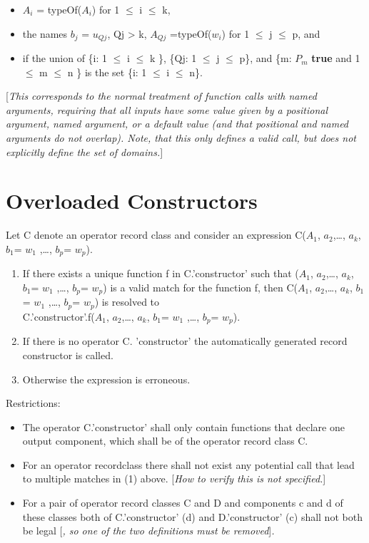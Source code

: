 \documentclass[10pt,a4paper]{report}
\def\doublelabel#1{\label{#1}\hypertarget{#1}{}}
\renewcommand{\labelenumi}{\arabic{enumi}.}
\begin{document}
\begin{itemize}
\item
  $A_{i}$ = typeOf($A_{i}$) for 1 $\le$ i $\le$ k,
\item
  the names $b_{j}$ = $u_{Qj}$, Qj \textgreater{}
  k, $A_{Qj}$ =typeOf($w_{i}$) for 1 $\le$ j $\le$ p, and
\item
  if the union of \{i: 1 $\le$ i $\le$ k \}, \{Qj: 1 $\le$ j $\le$ p\}, and \{m:
  $P_{m}$ \textbf{true} and 1 $\le$ m $\le$ n \} is the set \{i: 1 $\le$
  i $\le$ n\}.
\end{itemize}

{[}\emph{This corresponds to the normal treatment of function calls with
named arguments, requiring that all inputs have some value given by a
positional argument, named argument, or a default value (and that
positional and named arguments do not overlap). Note, that this only
defines a valid call, but does not explicitly define the set of
domains.}{]}

\section{Overloaded Constructors}\doublelabel{overloaded-constructors}

Let C denote an operator record class and consider an expression
C($A_1$, $a_{2}$,\ldots{}, $a_{k}$,
$b_{1}$= $w_{1}$ ,\ldots{}, $b_{p}$=
$w_{p}$).

\begin{enumerate}
\def\labelenumi{\arabic{enumi}.}
\item
  If there exists a {unique} function f in C.'constructor' such that
  ($A_1$, $a_{2}$,\ldots{}, $a_{k}$,
  $b_{1}$= $w_{1}$ ,\ldots{}, $b_{p}$=
  $w_{p}$) is a valid match for the function f, then
  C($A_1$, $a_{2}$,\ldots{}, $a_{k}$,
  $b_{1}$= $w_{1}$ ,\ldots{}, $b_{p}$=
  $w_{p}$) is resolved to\\
  C.'constructor'.f($A_1$, $a_{2}$,\ldots{},
  $a_{k}$, $b_{1}$= $w_{1}$ ,\ldots{},
  $b_{p}$= $w_{p}$).
\item
  If there is no operator C. 'constructor' the automatically generated
  record constructor is called.
\item
  Otherwise the expression is erroneous.
\end{enumerate}

Restrictions:

\begin{itemize}
\item
  The operator C.'constructor' shall only contain functions that declare
  one output component, which shall be of the operator record class C.
\item
  For an operator recordclass there shall not exist any potential call
  that lead to multiple matches in (1) above. {[}\emph{How to verify
  this is not specified.}{]}
\item
  For a pair of operator record classes C and D and components c and d
  of these classes both of C.'constructor' (d) and D.'constructor' (c)
  shall not both be legal {[}\emph{, so one of the two definitions must
  be removed}{]}\emph{.}
\end{itemize}
\end{document}
